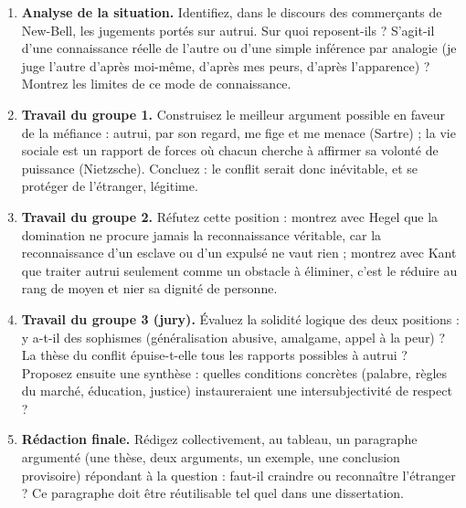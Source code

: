 \documentclass[11pt]{article}
\newcommand{\cle}[1]{{\popxbold\color{popdark}#1}}
\newcounter{popsec}
\newcounter{popsub}
\newcommand{\courssub}[1]{%
  \stepcounter{popsub}%
  \par\vspace{9pt}\noindent{\popxbold\fontsize{11.5}{13}\selectfont\color{popink}{\color{poporange}\thepopsec.\thepopsub}\hspace{6pt}#1}\par\nopagebreak\vspace{4pt}
}
\begin{document}
\begin{enumerate}
\item \textbf{Analyse de la situation.} Identifiez, dans le discours des commerçants de New-Bell, les jugements portés sur autrui. Sur quoi reposent-ils ? S'agit-il d'une connaissance réelle de l'autre ou d'une simple inférence par \cle{analogie} (je juge l'autre d'après moi-même, d'après mes peurs, d'après l'apparence) ? Montrez les limites de ce mode de connaissance.
\item \textbf{Travail du groupe 1.} Construisez le meilleur argument possible en faveur de la méfiance : autrui, par son \cle{regard}, me fige et me menace (Sartre) ; la vie sociale est un rapport de forces où chacun cherche à affirmer sa \cle{volonté de puissance} (Nietzsche). Concluez : le conflit serait donc inévitable, et se protéger de l'étranger, légitime.
\item \textbf{Travail du groupe 2.} Réfutez cette position : montrez avec Hegel que la domination ne procure jamais la \cle{reconnaissance} véritable, car la reconnaissance d'un esclave ou d'un expulsé ne vaut rien ; montrez avec Kant que traiter autrui seulement comme un obstacle à éliminer, c'est le réduire au rang de moyen et nier sa dignité de personne.
\item \textbf{Travail du groupe 3 (jury).} Évaluez la solidité logique des deux positions : y a-t-il des sophismes (généralisation abusive, amalgame, appel à la peur) ? La thèse du conflit épuise-t-elle tous les rapports possibles à autrui ? Proposez ensuite une synthèse : quelles conditions concrètes (palabre, règles du marché, éducation, justice) instaureraient une intersubjectivité de respect ?
\item \textbf{Rédaction finale.} Rédigez collectivement, au tableau, un paragraphe argumenté (une thèse, deux arguments, un exemple, une conclusion provisoire) répondant à la question : faut-il craindre ou reconnaître l'étranger ? Ce paragraphe doit être réutilisable tel quel dans une dissertation.
\end{enumerate}

\courssub{Ressources à mobiliser}
\end{document}
